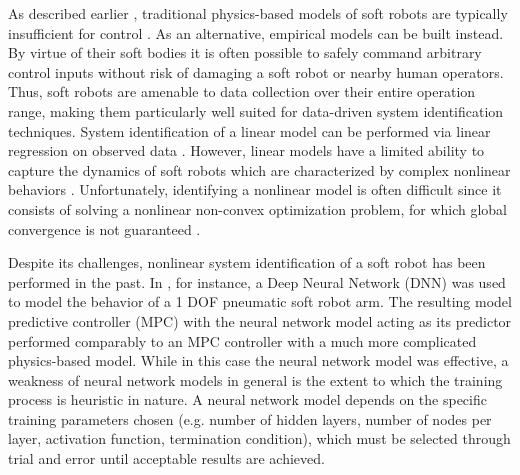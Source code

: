As described earlier , traditional physics-based models of soft robots are typically insufficient 
 for control . 
As an alternative, empirical models can be built instead.
By virtue of their soft bodies it is often possible to safely command arbitrary control inputs without risk of damaging a soft robot or nearby human operators.
Thus, soft robots are amenable to data collection over their entire operation range, making them particularly well suited for data-driven system identification techniques.
System identification of a linear model can be performed via linear regression on observed data \cite{ljung1987system}.
However, linear models have a limited ability to capture the dynamics of soft robots which are characterized by complex nonlinear behaviors \cite{rus2015design}.
Unfortunately, identifying a nonlinear model is often difficult since it consists of solving a nonlinear non-convex optimization problem, for which global convergence is not guaranteed .

Despite its challenges, nonlinear system identification of a soft robot has been performed in the past.
In \cite{gillespie2018learning}, for instance, a Deep Neural Network (DNN) was used to model the behavior of a 1 DOF pneumatic soft robot arm.
The resulting model predictive controller (MPC) with the neural network model acting as its predictor performed comparably to an MPC controller with a much more complicated physics-based model.
While in this case the neural network model was effective, a weakness of neural network models in general is the extent to which the training process is heuristic in nature.
A neural network model depends on the specific training parameters chosen (e.g. number of hidden layers, number of nodes per layer, activation function, termination condition), which must be selected through trial and error until acceptable results are achieved.

